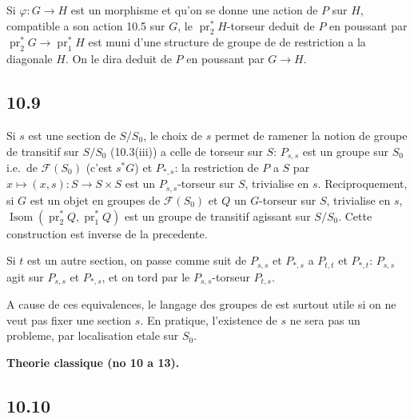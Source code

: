 \documentclass[12pt,a4paper]{article}
\theoremstyle{plain}
\theoremstyle{definition}
\theoremstyle{remark}
\DeclareMathOperator{\Isom}{Isom}
\DeclareMathOperator{\pr}{pr}
\begin{document}
Si $\varphi: G \to H$ est un morphisme et qu'on se donne une action de $P$ sur $H$, compatible a son action 10.5 sur $G$, le $\pr_2^* H$-torseur deduit de $P$ en poussant par $\pr_2^* G \to \pr_1^* H$ est muni d'une structure de groupe de de restriction a la diagonale $H$. On le dira deduit de $P$ en poussant par $G \to H$.

\subsection*{10.9}

Si $s$ est une section de $S/S_0$, le choix de $s$ permet de ramener la notion de groupe de transitif sur $S/S_0$ (10.3(iii)) a celle de torseur sur $S$: $P_{s,s}$ est un groupe sur $S_0$ i.e.~de $\mathcal{F}(S_0)$ (c'est $s^* G$) et $P_{*,s}$: la restriction de $P$ a $S$ par $x \mapsto (x,s): S \to S \times S$ est un $P_{s,s}$-torseur sur $S$, trivialise en $s$. Reciproquement, si $G$ est un objet en groupes de $\mathcal{F}(S_0)$ et $Q$ un $G$-torseur sur $S$, trivialise en $s$, $\Isom(\pr_2^* Q, \pr_1^* Q)$ est un groupe de transitif agissant sur $S/S_0$. Cette construction est inverse de la precedente.

Si $t$ est un autre section, on passe comme suit de $P_{s,s}$ et $P_{*,s}$ a $P_{t,t}$ et $P_{*,t}$: $P_{s,s}$ agit sur $P_{s,s}$ et $P_{*,s}$, et on tord par le $P_{s,s}$-torseur $P_{t,s}$.

A cause de ces equivalences, le langage des groupes de est surtout utile si on ne veut pas fixer une section $s$. En pratique, l'existence de $s$ ne sera pas un probleme, par localisation etale sur $S_0$.


\textbf{Theorie classique (no 10 a 13).}

\subsection*{10.10}
\end{document}

